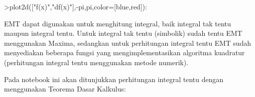 \documentclass[a4paper,10pt]{article}
\begin{document}
\begin{eulernotebook}
\begin{eulercomment}
\begin{eulercomment}
\begin{eulercomment}
\begin{eulercomment}
\begin{eulercomment}
\begin{eulercomment}
\begin{eulercomment}
\begin{eulercomment}
\begin{eulercomment}
\begin{eulercomment}
\begin{eulercomment}
\begin{eulercomment}
\begin{eulercomment}
\begin{eulercomment}
\begin{eulercomment}
\begin{eulercomment}
\begin{eulerprompt}
>plot2d(["f(x)","df(x)"],-pi,pi,color=[blue,red]):
\end{eulerprompt}
\begin{eulercomment}
EMT dapat digunakan untuk menghitung integral, baik integral tak tentu maupun
integral tentu. Untuk integral tak tentu (simbolik) sudah tentu EMT menggunakan
Maxima, sedangkan untuk perhitungan integral tentu EMT sudah menyediakan beberapa
fungsi yang mengimplementasikan algoritma kuadratur (perhitungan integral tentu
menggunakan metode numerik).

Pada notebook ini akan ditunjukkan perhitungan integral tentu dengan menggunakan
Teorema Dasar Kalkulus:


\end{eulercomment}
\end{eulercomment}
\end{eulercomment}
\end{eulercomment}
\end{eulercomment}
\end{eulercomment}
\end{eulercomment}
\end{eulercomment}
\end{eulercomment}
\end{eulercomment}
\end{eulercomment}
\end{eulercomment}
\end{eulercomment}
\end{eulercomment}
\end{eulercomment}
\end{eulercomment}
\end{eulercomment}
\end{eulernotebook}
\end{document}
